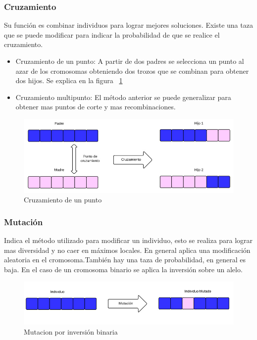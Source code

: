 \subsubsection{Cruzamiento}
Su función es combinar individuos para lograr mejores soluciones. 
Existe una taza que se puede modificar para indicar la probabilidad de que se realice el cruzamiento.

\begin{itemize}
	\item Cruzamiento de un punto: A partir de dos padres se selecciona un punto al azar de los cromosomas obteniendo dos trozos que se combinan para obtener dos hijos. Se explica en la figura ~\ref{fig:cruzamiento1}
	\item Cruzamiento multipunto: El método anterior se puede generalizar para obtener mas puntos de corte y mas recombinaciones.
\end{itemize}

\begin{figure}[h]
\centering
\includegraphics[width=\textwidth]{Figures/cruzamiento1}
\caption{Cruzamiento de un punto}
\label{fig:cruzamiento1}
\end{figure}

\subsubsection{Mutación} 
Indica el método utilizado para modificar un individuo, esto se realiza para lograr mas diversidad y no caer en máximos locales. En general aplica una modificación aleatoria en el cromosoma.También hay una taza de probabilidad, en general es baja. En el caso de un cromosoma binario se aplica la inversión sobre un alelo.

\begin{figure}[h]
\centering
\includegraphics[width=1\linewidth]{Figures/mutacion1}
\caption{Mutacion por inversión binaria}
\label{fig:mutacion1}
\end{figure}


